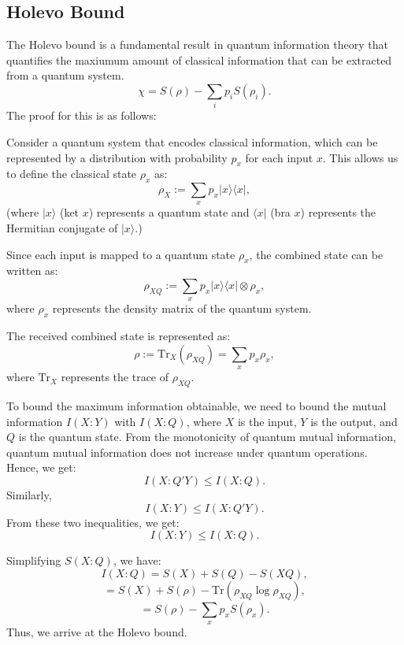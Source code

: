 \subsection{Holevo Bound}

The Holevo bound is a fundamental result in quantum information theory that quantifies the maxiumum amount of classical information that can be extracted from a quantum system.
\[
\chi = S(\rho) - \sum_i p_i S(\rho_i).
\]
The proof for this is as follows:

Consider a quantum system that encodes classical information, which can be represented by a distribution with probability $p_x$ for each input $x$. This allows us to define the classical state $\rho_x$ as:
\[
\rho_X := \sum_x p_x \lvert x \rangle \langle x \rvert,
\]
(where $\lvert x \rangle$ (ket $x$) represents a quantum state and $\langle x \rvert$ (bra $x$) represents the Hermitian conjugate of $\lvert x \rangle$.)

Since each input is mapped to a quantum state $\rho_x$, the combined state can be written as:
\[
\rho_{XQ} := \sum_x p_x \lvert x \rangle \langle x \rvert \otimes \rho_x,
\]
where $\rho_x$ represents the density matrix of the quantum system.

The received combined state is represented as:
\[
\rho := \text{Tr}_X (\rho_{XQ}) = \sum_x p_x \rho_x,
\]
where $\text{Tr}_X$ represents the trace of $\rho_{XQ}$.

To bound the maximum information obtainable, we need to bound the mutual information $I(X : Y)$ with $I(X : Q)$, where $X$ is the input, $Y$ is the output, and $Q$ is the quantum state. From the monotonicity of quantum mutual information, quantum mutual information does not increase under quantum operations. Hence, we get:
\[
I(X : Q'Y) \leq I(X : Q).
\]
Similarly,
\[
I(X : Y) \leq I(X : Q'Y).
\]
From these two inequalities, we get:
\[
I(X : Y) \leq I(X : Q).
\]

Simplifying $S(X : Q)$, we have:
\[
I(X : Q) = S(X) + S(Q) - S(XQ),
\]
\[
= S(X) + S(\rho) - \text{Tr}(\rho_{XQ} \log \rho_{XQ}),
\]
\[
= S(\rho) - \sum_x p_x S(\rho_x).
\]
Thus, we arrive at the Holevo bound.

